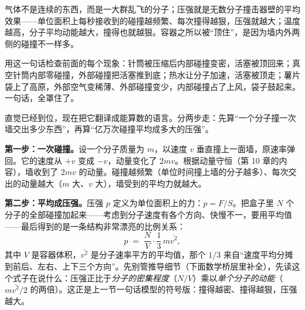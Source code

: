 
\begin{oneline}
气体不是连续的东西，而是一大群乱飞的分子；压强就是无数分子撞击器壁的平均效果——单位面积上每秒接收到的碰撞越频繁、每次撞得越狠，压强就越大；温度越高，分子平均动能越大，撞得也就越狠。容器之所以被“顶住”，是因为墙内外两侧的碰撞不一样多。
\end{oneline}

用这一句话检查前面的每个现象：针筒被压缩后内部碰撞变密，活塞被顶回来；真空针筒内部零碰撞，外部碰撞把活塞推到底；热水让分子加速，活塞被顶走；薯片袋上了高原，外部空气变稀薄、外部碰撞变少，内部碰撞占了上风，袋子鼓起来。一句话，全罩住了。


直觉已经到位，现在把它翻译成能算数的语言。分两步走：先算“一个分子撞一次墙交出多少东西”，再算“亿万次碰撞平均成多大的压强”。

\textbf{第一步：一次碰撞。}设一个分子质量为 \(m\)，以速度 \(v\) 垂直撞上一面墙，原速率弹回。它的速度从 \(+v\) 变成 \(-v\)，动量变化了 \(2mv\)。根据动量守恒（第 10 章的内容），墙收到了 \(2mv\) 的动量。碰撞越频繁（单位时间撞上墙的分子越多）、每次交出的动量越大（\(m\) 大、\(v\) 大），墙受到的平均力就越大。

\textbf{第二步：平均成压强。}压强 \(p\) 定义为单位面积上的力：\(p = F/S\)。把盒子里 \(N\) 个分子的全部碰撞加起来——考虑到分子速度有各个方向、快慢不一，要用平均值——最后得到的是一条结构非常漂亮的比例关系：
\[
p \;=\; \frac{N}{V}\cdot \frac{1}{3}\, m \overline{v^{2}},
\]
其中 \(V\) 是容器体积，\(\overline{v^{2}}\) 是分子速率平方的平均值，那个 \(1/3\) 来自“速度平均分摊到前后、左右、上下三个方向”。先别管推导细节（下面数学桥层里补全），先读这个式子在说什么：压强正比于\emph{分子的密集程度}（\(N/V\)）乘以\emph{单个分子的动能}（\(m\overline{v^2}/2\) 的两倍）。这正是上一节一句话模型的符号版：撞得越密、撞得越狠，压强越大。

\begin{center}
\end{center}

